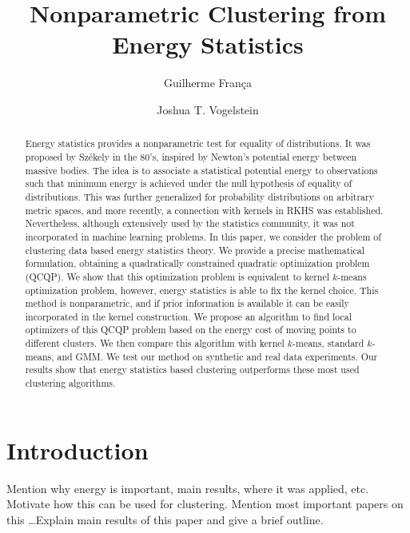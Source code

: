 \documentclass[aps,preprint,nofootinbib,floatfix]{revtex4-1}
\begin{document}
\title{Nonparametric Clustering from  Energy Statistics}

\author{Guilherme Fran\c ca}

\author{Joshua T. Vogelstein}



\begin{abstract}
Energy statistics provides a nonparametric test for equality of distributions.
It was proposed by 
Sz\' ekely in the 80's,
inspired by Newton's potential energy between massive bodies. The idea
is to associate a statistical potential energy to observations such that 
minimum energy is achieved under the null hypothesis of equality of 
distributions. This 
was further generalized for probability 
distributions on arbitrary metric spaces,
and more recently, a connection with kernels in RKHS was established.
Nevertheless, although extensively used by the statistics community, it was
not incorporated in machine learning problems.
In this paper, we consider the problem of clustering data based
energy statistics theory. 
We provide a precise mathematical formulation, obtaining
a quadratically constrained quadratic optimization problem (QCQP). 
We show that
this optimization problem is equivalent to kernel $k$-means
optimization problem, however,
energy statistics is able to fix the kernel choice. 
This method is nonparametric, and if prior information is available
it can be easily incorporated in the kernel construction.
We propose an algorithm
to find local optimizers of this QCQP problem based on the energy cost
of moving points to different clusters. We then compare this algorithm with
kernel $k$-means, standard $k$-means, and GMM. We test our method
on synthetic and real data experiments.
Our results show that energy statistics based clustering outperforms
these most used clustering algorithms.
\end{abstract}

\maketitle

\section{Introduction}

Mention why energy is important, main results, where it was applied, etc.
Motivate how this can be used for clustering. Mention most important
papers on this \ldots Explain main results of this paper and give a brief
outline.
\end{document}
